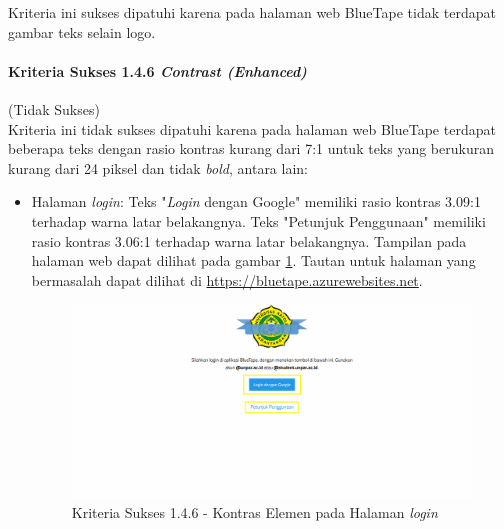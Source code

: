 \documentclass[a4paper,twoside]{article}
\begin{document}
\begin{enumerate}
		Kriteria ini sukses dipatuhi karena pada halaman web BlueTape tidak terdapat gambar teks selain logo.

		\paragraph{Kriteria Sukses 1.4.6 \textit{Contrast (Enhanced)}}
		\label{par:kepatuhan_bluetape_kriteria_sukses_1.4.6}
		(Tidak Sukses)\\

		Kriteria ini tidak sukses dipatuhi karena pada halaman web BlueTape terdapat beberapa teks dengan rasio kontras kurang dari 7:1 untuk teks yang berukuran kurang dari 24 piksel dan tidak \textit{bold}, antara lain:

		\begin{itemize}
			\item Halaman \textit{login}: Teks "\textit{Login} dengan Google" memiliki rasio kontras 3.09:1 terhadap warna latar belakangnya. Teks "Petunjuk Penggunaan" memiliki rasio kontras 3.06:1 terhadap warna latar belakangnya. Tampilan pada halaman web dapat dilihat pada gambar \ref{fig:1.4.6_contrast_enchanced_1}. Tautan untuk halaman yang bermasalah dapat dilihat di \url{https://bluetape.azurewebsites.net}.
			\begin{figure}[H]
				\centering  
				\includegraphics[scale=0.3, frame]{kriteria-sukses-1-4-6-contrast-enchanced-1}  
				\caption[Kriteria Sukses 1.4.6 - Kontras Elemen pada Halaman \textit{login}]{Kriteria Sukses 1.4.6 - Kontras Elemen pada Halaman \textit{login}}
				\label{fig:1.4.6_contrast_enchanced_1}  
			\end{figure} 


\end{itemize}
\end{enumerate}
\end{document}

